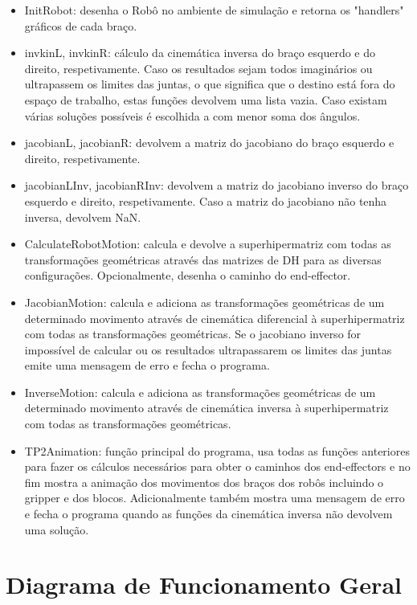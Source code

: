 \documentclass{report}
\begin{document}
\begin{itemize}
    \item InitRobot: desenha o Robô no ambiente de simulação e retorna os "handlers" gráficos de cada braço.
    \item invkinL, invkinR: cálculo da cinemática inversa do braço esquerdo e do direito, respetivamente. Caso os resultados sejam todos imaginários ou ultrapassem os limites das juntas, o que significa que o destino está fora do espaço de trabalho, estas funções devolvem uma lista vazia. Caso existam várias soluções possíveis é escolhida a com menor soma dos ângulos.
    \item jacobianL, jacobianR: devolvem a matriz do jacobiano do braço esquerdo e direito, respetivamente.
    \item jacobianLInv, jacobianRInv: devolvem a matriz do jacobiano inverso do braço esquerdo e direito, respetivamente. Caso a matriz do jacobiano não tenha inversa, devolvem NaN.
    \item CalculateRobotMotion: calcula e devolve a superhipermatriz com todas as transformações geométricas através das matrizes de DH para as diversas configurações. Opcionalmente, desenha o caminho do end-effector.
    \item JacobianMotion: calcula e adiciona as transformações geométricas de um determinado movimento através de cinemática diferencial à superhipermatriz com todas as transformações geométricas. Se o jacobiano inverso for impossível de calcular ou os resultados ultrapassarem os limites das juntas emite uma mensagem de erro e fecha o programa.
    \item InverseMotion: calcula e adiciona as transformações geométricas de um determinado movimento através de cinemática inversa à superhipermatriz com todas as transformações geométricas.
    \item TP2Animation: função principal do programa, usa todas as funções anteriores para fazer os cálculos necessários para obter o caminhos dos end-effectors e no fim mostra a animação dos movimentos dos braços dos robôs incluindo o gripper e dos blocos. Adicionalmente também mostra uma mensagem de erro e fecha o programa quando as funções da cinemática inversa não devolvem uma solução.
\end{itemize}

\section{Diagrama de Funcionamento Geral}
\end{document}

